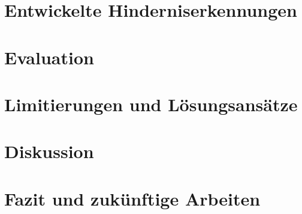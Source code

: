 \documentclass[pdftex,12pt,a4paper]{report}
\begin{document}

\chapter{Entwickelte Hinderniserkennungen}
\label{chp:developed_algorithms}



\chapter{Evaluation}
\label{chp:evaluation}



\chapter{Limitierungen und Lösungsansätze}
\label{chp:conflicts}



\chapter{Diskussion}
\label{chp:discussion}



\chapter{Fazit und zukünftige Arbeiten}
\label{chp:fazit}



\appendix






    


\nocite{zureiki2008stereo}
\nocite{opencvoreilly}
\nocite{cyganek2011introduction}

\end{document}
